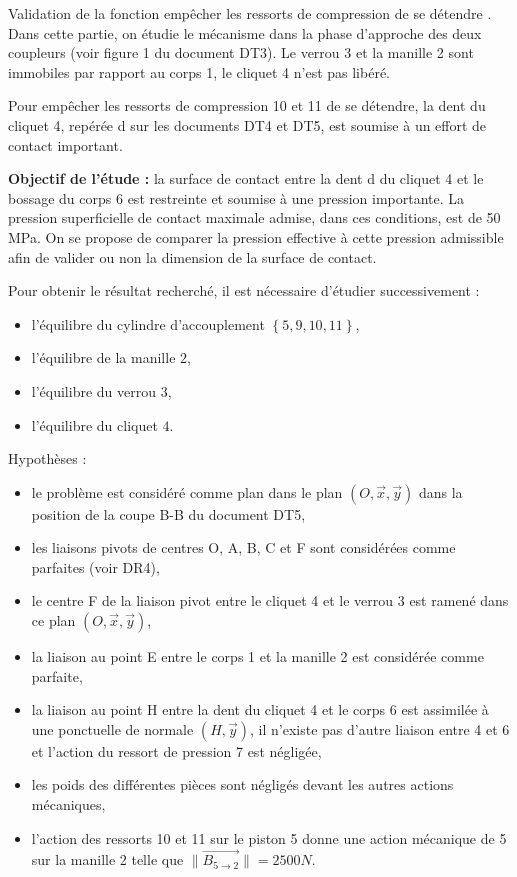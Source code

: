 Validation de la fonction \og empêcher les ressorts de compression de se détendre \fg. Dans cette partie, on étudie le mécanisme dans la phase d'approche des deux coupleurs (voir figure 1 du document DT3). Le verrou 3 et la manille 2 sont immobiles par rapport au corps 1, le cliquet 4 n'est pas libéré. 

Pour empêcher les ressorts de compression 10 et 11 de se détendre, la dent du cliquet 4, repérée \og d \fg sur les documents DT4 et DT5, est soumise à un effort de contact important. 

\textbf{Objectif de l'étude :} la surface de contact entre la dent \og d \fg du cliquet 4 et le bossage du corps 6 est restreinte et soumise à une pression importante. La pression superficielle de contact maximale admise, dans ces conditions, est de 50 MPa. On se propose de comparer la pression effective à cette pression admissible afin de valider ou non la dimension de la surface de contact. 

Pour obtenir le résultat recherché, il est nécessaire d'étudier successivement : 
\begin{itemize}
 \item l'équilibre du cylindre d'accouplement $\left\{5,9,10,11\right\}$, 
 \item l'équilibre de la manille $2$, 
 \item l'équilibre du verrou $3$, 
 \item l'équilibre du cliquet $4$. 
\end{itemize}


Hypothèses :
\begin{itemize}
 \item le problème est considéré comme plan dans le plan $\left(O,\overrightarrow{x},\overrightarrow{y}\right)$ dans la position de la coupe B-B du document DT5, 
 \item les liaisons pivots de centres O, A, B, C et F sont considérées comme parfaites (voir DR4), 
 \item le centre F de la liaison pivot entre le cliquet 4 et le verrou 3 est ramené dans ce plan $\left(O,\overrightarrow{x},\overrightarrow{y}\right)$, 
 \item la liaison au point E entre le corps 1 et la manille 2 est considérée comme parfaite, 
 \item la liaison au point H entre la dent du cliquet 4 et le corps 6 est assimilée à une ponctuelle de normale $\left(H,\overrightarrow{y}\right)$, il n'existe pas d'autre liaison entre 4 et 6 et l'action du ressort de pression 7 est négligée, 
 \item les poids des différentes pièces sont négligés devant les autres actions mécaniques, 
 \item l'action des ressorts 10 et 11 sur le piston 5 donne une action mécanique de 5 sur la manille 2 telle que $\|\overrightarrow{B_{5 \rightarrow 2}}\|= 2500 N$. 
\end{itemize}

